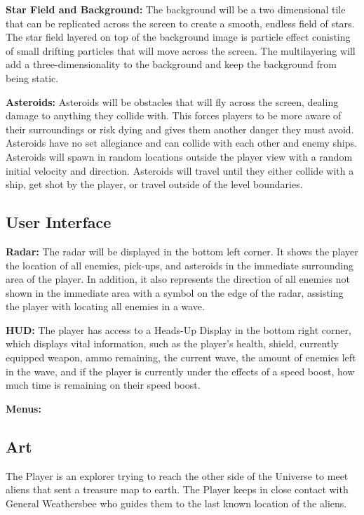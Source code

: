 \documentclass[12pt]{article}       %
\def\hs{\hspace{15pt}}
\begin{document}
	{\bf Star Field and Background:} The background will be a two dimensional tile that can be replicated across the screen to create a smooth, endless field of stars. The star field layered on top of the background image is particle effect conisting of small drifting particles that will move across the screen. The multilayering will add a three-dimensionality to the background and keep the background from being static.

	{\bf Asteroids:}  Asteroids will be obstacles that will fly across the screen, dealing damage to anything they collide with. This forces players to be more aware of their surroundings or risk dying and gives them another danger they must avoid. Asteroids have no set allegiance and can collide with each other and enemy ships. Asteroids will spawn in random locations outside the player view with a random initial velocity and direction. Asteroids will travel until they either collide with a ship, get shot by the player, or travel outside of the level boundaries.

\subsection{User Interface} %

	{\bf Radar:} The radar will be displayed in the bottom left corner. It shows the player the location of all enemies, pick-ups, and asteroids in the immediate surrounding area of the player. In addition, it also represents the direction of all enemies not shown in the immediate area with a symbol on the edge of the radar, assisting the player with locating all enemies in a wave.

	{\bf HUD:} The player has access to a Heads-Up Display in the bottom right corner, which displays vital information, such as the player's health, shield, currently equipped weapon, ammo remaining, the current wave, the amount of enemies left in the wave, and if the player is currently under the effects of a speed boost, how much time is remaining on their speed boost.

	{\bf Menus:}

\subsection{Art} %

	\hs {\bf Story:} The Player is an explorer trying to reach the other side of the Universe to meet aliens that sent a treasure map to earth. The Player keeps in close contact with General Weathersbee who guides them to the last known location of the aliens. 
\end{document}
